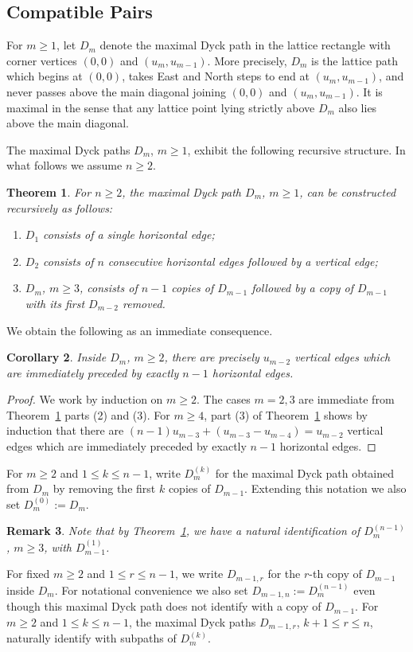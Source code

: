 \documentclass{amsart}
\newtheorem{theorem}{Theorem}[section]
\newtheorem{corollary}[theorem]{Corollary}
\newtheorem{remark}[theorem]{Remark}
\numberwithin{equation}{section}
\begin{document}
\subsection{Compatible Pairs}
For $m\ge1$, let $D_m$ denote the maximal Dyck path in the lattice rectangle with corner vertices $(0,0)$ and $(u_m,u_{m-1})$.  
More precisely, $D_m$ is the lattice path which begins at $(0,0)$, takes East and North steps to end at $(u_m,u_{m-1})$, and never passes above the main diagonal joining $(0,0)$ and $(u_m,u_{m-1})$.  
It is maximal in the sense that any lattice point lying strictly above $D_m$ also lies above the main diagonal.  

The maximal Dyck paths $D_m$, $m\ge1$, exhibit the following recursive structure.
In what follows we assume $n\ge2$.
\begin{theorem}
  \cite[Corollary 2.4]{rupel}
  \label{th:dyck path recursion}
  For $n\ge2$, the maximal Dyck path $D_m$, $m\ge1$, can be constructed recursively as follows:
  \begin{enumerate}
    \item $D_1$ consists of a single horizontal edge;
    \item $D_2$ consists of $n$ consecutive horizontal edges followed by a vertical edge;
    \item $D_m$, $m\ge3$, consists of $n-1$ copies of $D_{m-1}$ followed by a copy of $D_{m-1}$ with its first $D_{m-2}$ removed.
  \end{enumerate}
\end{theorem}

We obtain the following as an immediate consequence.
\begin{corollary}
  \label{cor:short hooks}
  Inside $D_m$, $m\ge2$, there are precisely $u_{m-2}$ vertical edges which are immediately preceded by exactly $n-1$ horizontal edges.
\end{corollary}
\begin{proof}
  We work by induction on $m\ge2$.
  The cases $m=2,3$ are immediate from Theorem~\ref{th:dyck path recursion} parts (2) and (3).
  For $m\ge4$, part (3) of Theorem~\ref{th:dyck path recursion} shows by induction that there are $(n-1)u_{m-3}+(u_{m-3}-u_{m-4})=u_{m-2}$ vertical edges which are immediately preceded by exactly $n-1$ horizontal edges.
\end{proof}

For $m\ge2$ and $1\le k\le n-1$, write $D_m^{(k)}$ for the maximal Dyck path obtained from $D_m$ by removing the first $k$ copies of $D_{m-1}$.
Extending this notation we also set $D_m^{(0)}:=D_m$.
\begin{remark}
  Note that by Theorem~\ref{th:dyck path recursion}, we have a natural identification of $D_m^{(n-1)}$, $m\ge3$, with $D_{m-1}^{(1)}$.
\end{remark}
For fixed $m\ge2$ and $1\le r\le n-1$, we write $D_{m-1,r}$ for the $r$-th copy of $D_{m-1}$ inside $D_m$.
For notational convenience we also set $D_{m-1,n}:=D_m^{(n-1)}$ even though this maximal Dyck path does not identify with a copy of $D_{m-1}$.
For $m\ge2$ and $1\le k\le n-1$, the maximal Dyck paths $D_{m-1,r}$, $k+1\le r\le n$, naturally identify with subpaths of $D_m^{(k)}$.
\end{document}
